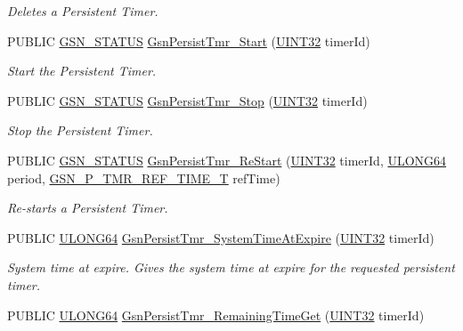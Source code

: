 \begin{DoxyCompactItemize}
\begin{DoxyCompactList}\small\item\em Deletes a Persistent Timer. \end{DoxyCompactList}\item 
PUBLIC \hyperlink{a00660_gada5951904ac6110b1fa95e51a9ddc217}{GSN\_\-STATUS} \hyperlink{a00671_ga13a97f1941e64cdab5ad524f5d244985}{GsnPersistTmr\_\-Start} (\hyperlink{a00660_gae1e6edbbc26d6fbc71a90190d0266018}{UINT32} timerId)
\begin{DoxyCompactList}\small\item\em Start the Persistent Timer. \end{DoxyCompactList}\item 
PUBLIC \hyperlink{a00660_gada5951904ac6110b1fa95e51a9ddc217}{GSN\_\-STATUS} \hyperlink{a00671_ga038419003a0a454c1e3641818a4a8a1b}{GsnPersistTmr\_\-Stop} (\hyperlink{a00660_gae1e6edbbc26d6fbc71a90190d0266018}{UINT32} timerId)
\begin{DoxyCompactList}\small\item\em Stop the Persistent Timer. \end{DoxyCompactList}\item 
PUBLIC \hyperlink{a00660_gada5951904ac6110b1fa95e51a9ddc217}{GSN\_\-STATUS} \hyperlink{a00671_ga1caf8a120d6264cd9e8780110d306e98}{GsnPersistTmr\_\-ReStart} (\hyperlink{a00660_gae1e6edbbc26d6fbc71a90190d0266018}{UINT32} timerId, \hyperlink{a00660_ga28961430434ccabca6862ea93fe9a15b}{ULONG64} period, \hyperlink{a00671_ga8d27b193b47e23bf2bd68b439badf3d6}{GSN\_\-P\_\-TMR\_\-REF\_\-TIME\_\-T} refTime)
\begin{DoxyCompactList}\small\item\em Re-\/starts a Persistent Timer. \end{DoxyCompactList}\item 
PUBLIC \hyperlink{a00660_ga28961430434ccabca6862ea93fe9a15b}{ULONG64} \hyperlink{a00671_ga6f5bc2af45625f650fe1de1b30274d4c}{GsnPersistTmr\_\-SystemTimeAtExpire} (\hyperlink{a00660_gae1e6edbbc26d6fbc71a90190d0266018}{UINT32} timerId)
\begin{DoxyCompactList}\small\item\em System time at expire. Gives the system time at expire for the requested persistent timer. \end{DoxyCompactList}\item 
PUBLIC \hyperlink{a00660_ga28961430434ccabca6862ea93fe9a15b}{ULONG64} \hyperlink{a00671_ga72958206fd50e03c6e781bcca39728da}{GsnPersistTmr\_\-RemainingTimeGet} (\hyperlink{a00660_gae1e6edbbc26d6fbc71a90190d0266018}{UINT32} timerId)

\end{DoxyCompactItemize}
